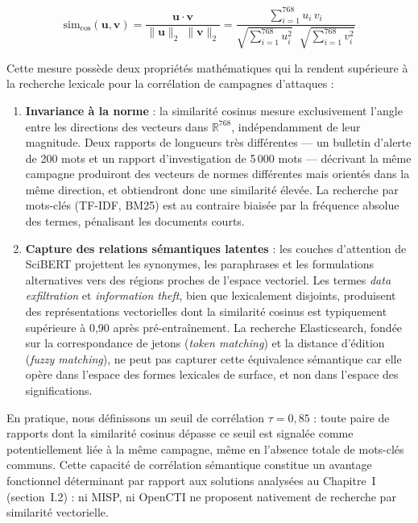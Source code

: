 \begin{equation}
\label{eq:cosine-sim}
\text{sim}_{\cos}(\mathbf{u}, \mathbf{v}) = \frac{\mathbf{u} \cdot \mathbf{v}}{\|\mathbf{u}\|_2 \; \|\mathbf{v}\|_2} = \frac{\displaystyle\sum_{i=1}^{768} u_i \, v_i}{\sqrt{\displaystyle\sum_{i=1}^{768} u_i^2} \;\; \sqrt{\displaystyle\sum_{i=1}^{768} v_i^2}}
\end{equation}

Cette mesure possède deux propriétés mathématiques qui la rendent supérieure à la recherche lexicale pour la corrélation de campagnes d'attaques :

\begin{enumerate}
    \item \textbf{Invariance à la norme} : la similarité cosinus mesure exclusivement l'angle entre les directions des vecteurs dans $\mathbb{R}^{768}$, indépendamment de leur magnitude. Deux rapports de longueurs très différentes --- un bulletin d'alerte de 200 mots et un rapport d'investigation de 5\,000 mots --- décrivant la même campagne produiront des vecteurs de normes différentes mais orientés dans la même direction, et obtiendront donc une similarité élevée. La recherche par mots-clés (TF-IDF, BM25) est au contraire biaisée par la fréquence absolue des termes, pénalisant les documents courts.
    \item \textbf{Capture des relations sémantiques latentes} : les couches d'attention de SciBERT projettent les synonymes, les paraphrases et les formulations alternatives vers des régions proches de l'espace vectoriel. Les termes \textit{data exfiltration} et \textit{information theft}, bien que lexicalement disjoints, produisent des représentations vectorielles dont la similarité cosinus est typiquement supérieure à 0{,}90 après pré-entraînement. La recherche Elasticsearch, fondée sur la correspondance de jetons (\textit{token matching}) et la distance d'édition (\textit{fuzzy matching}), ne peut pas capturer cette équivalence sémantique car elle opère dans l'espace des formes lexicales de surface, et non dans l'espace des significations.
\end{enumerate}

En pratique, nous définissons un seuil de corrélation $\tau = 0{,}85$ : toute paire de rapports dont la similarité cosinus dépasse ce seuil est signalée comme potentiellement liée à la même campagne, même en l'absence totale de mots-clés communs. Cette capacité de corrélation sémantique constitue un avantage fonctionnel déterminant par rapport aux solutions analysées au Chapitre~I (section~I.2) : ni MISP, ni OpenCTI ne proposent nativement de recherche par similarité vectorielle.

